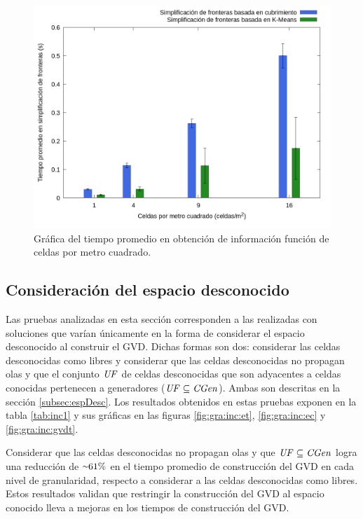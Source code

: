 \begin{figure}[H]
  \centerfloat

  \includegraphics[clip=true, width=\graphlen]{imagenes/graficas_chicas/graficas_histo_num/ident_obj/obj_id_time_mean.png}

  \caption{Gráfica del tiempo promedio en obtención de información función de celdas por metro cuadrado.}\label{fig:gra:idobj:iobt}

\end{figure}

\subsection{Consideración del espacio desconocido}\label{sec:exp:desco}

Las pruebas analizadas en esta sección corresponden a las realizadas con
soluciones que varían únicamente en la forma de considerar el espacio
desconocido al construir el GVD. Dichas formas son dos: considerar las
celdas desconocidas como libres y considerar que las celdas desconocidas no
propagan olas y que el conjunto $\mathit{UF}$ de celdas desconocidas que son
adyacentes a celdas conocidas pertenecen a generadores ($\mathit{UF} \subseteq
\mathit{CGen}$). Ambas son descritas en la sección \ref{subsec:espDesc}. Los
resultados obtenidos en estas pruebas exponen en la tabla \ref{tab:inc1} y sus
gráficas en las figuras \ref{fig:gra:inc:et}, \ref{fig:gra:inc:ec} y
\ref{fig:gra:inc:gvdt}.

Considerar que las celdas desconocidas no propagan olas y que $\mathit{UF}
\subseteq \mathit{CGen}$ logra una reducción de ${\smallsim}61\%$ en el tiempo
promedio de construcción del GVD en cada nivel de granularidad, respecto a
considerar a las celdas desconocidas como libres. Estos resultados validan que
restringir la construcción del GVD al espacio conocido lleva a mejoras en los
tiempos de construcción del GVD. 


